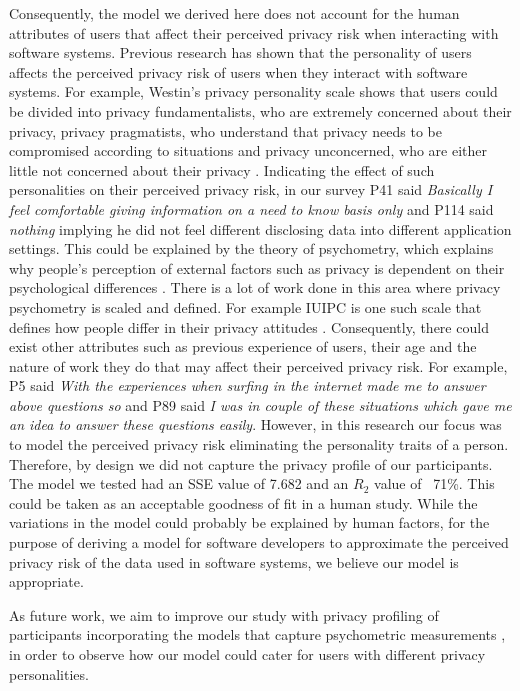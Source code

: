 \documentclass[10pt]{article}
\begin{document}
Consequently, the model we derived here does not account for the human attributes of users that affect their perceived privacy risk when interacting with software systems. Previous research has shown that the personality of users affects the perceived privacy risk of users when they interact with software systems. For example, Westin's privacy personality scale \cite {westin1991equifax} shows that users could be divided into privacy fundamentalists, who are extremely concerned about their privacy, privacy pragmatists, who understand that privacy needs to be compromised according to situations and privacy unconcerned, who are either little not concerned about their privacy \cite {westin1991equifax}. Indicating the effect of such personalities on their perceived privacy risk, in our survey P41 said \textit{Basically I feel comfortable giving information on a need to know basis only} and P114 said \textit {nothing} implying he did not feel different disclosing data into different application settings. This could be explained by the theory of psychometry, which explains  why people's perception of external factors such as privacy is dependent on their psychological differences \cite {malhotra2004internet, egelman2015predicting}. There is a lot of work done in this area where privacy psychometry is scaled and defined. For example IUIPC is one such scale that defines how people differ in their privacy attitudes \cite {malhotra2004internet}. Consequently, there could exist other attributes such as previous experience of users, their age and the nature of work they do that may affect their perceived privacy risk. For example, P5 said \textit{With the experiences when surfing in the internet made me to answer above questions so} and P89 said \textit {I was in couple of these situations which gave me an idea to answer these questions easily}. However, in this research our focus was to model the perceived privacy risk eliminating the personality traits of a person. Therefore, by design we did not capture the privacy profile of our participants. The model we tested had an SSE value of 7.682 and an $R_{2}$ value of ~71\%. This could be taken as an acceptable goodness of fit in a human study. While the variations in the model could probably be explained by human factors, for the purpose of deriving a model for software developers to approximate the perceived privacy risk of the data used in software systems, we believe our model is appropriate.

As future work, we aim to improve our study with privacy profiling of participants incorporating the models that capture psychometric measurements \cite {malhotra2004internet, egelman2015predicting, westin1991equifax}, in order to observe how our model could cater for users with different privacy personalities. 
\end{document}
